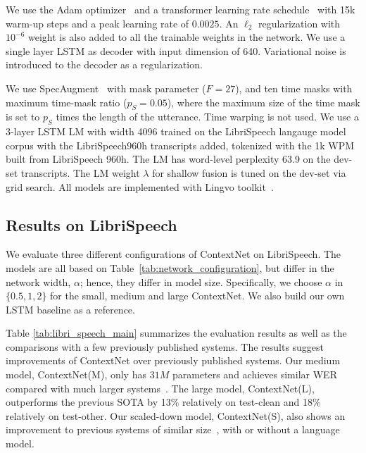 \documentclass[a4paper]{article}
\newcommand{\netname}{ContextNet}
\begin{document}
We use the Adam optimizer~\cite{kingma2014adam} and a transformer learning rate schedule~\cite{vaswani2017attention} with 15k warm-up steps and a peak learning rate of $0.0025$. An $\ell_2$ regularization with $10^{-6}$ weight is also added to all the trainable weights in the network. We use a single layer LSTM as decoder with input dimension of 640.  Variational noise is introduced to the decoder as a regularization. 

We use SpecAugment~\cite{park2019specaugment, largespecaugment} with mask parameter ($F = 27$), and ten time masks with maximum time-mask ratio ($p_S = 0.05$), where the maximum size of the time mask is set to $p_S$ times the length of the utterance. Time warping is not used. We use a 3-layer LSTM LM with width 4096 trained on the LibriSpeech langauge model corpus with the LibriSpeech960h transcripts added, tokenized with the 1k WPM built from LibriSpeech 960h. The LM has word-level perplexity 63.9 on the dev-set transcripts. The LM weight $\lambda$ for shallow fusion is tuned on the dev-set via grid search. All models are implemented with Lingvo toolkit~\cite{lingvo}.

\vspace{-0.05in}
\subsection{Results on LibriSpeech}
\vspace{-0.02in}

We evaluate three different configurations of \netname{} on LibriSpeech. The models are all based  on Table~\ref{tab:network_configuration}, but differ in the network width, $\alpha$; hence, they differ in model size. Specifically, we choose $\alpha$ in $\{0.5, 1, 2\}$ for the small, medium and large \netname{}. We also build our own LSTM baseline as a reference.

Table \ref{tab:libri_speech_main} summarizes the evaluation results as well as the comparisons with a few previously published systems. The results suggest improvements of \netname{} over previously published systems. Our medium model, \netname(M), only has $31M$ parameters and achieves similar WER compared with much larger systems~\cite{zhang2020transformer,synnaeve2019endtoend}. The large model, \netname(L), outperforms the previous SOTA by 13\% relatively on test-clean and 18\% relatively on test-other. Our scaled-down model, \netname(S), also shows an improvement to previous systems of similar size~\cite{kriman2019quartznet}, with or without a language model. 
\end{document}
